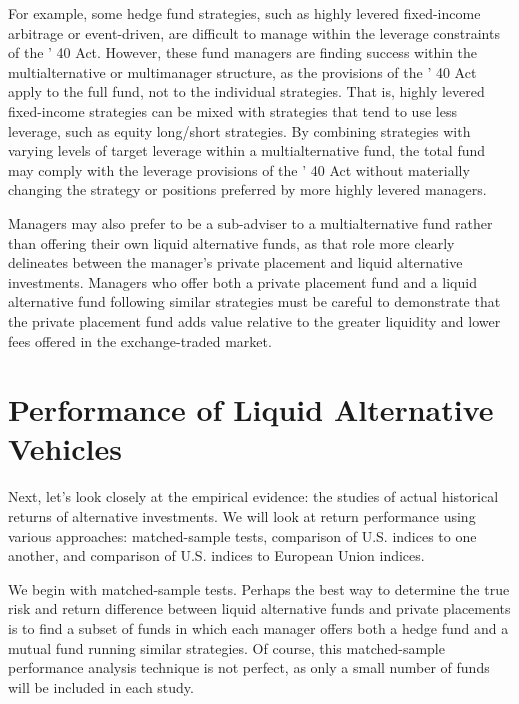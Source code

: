 \documentclass[11pt]{article}
\begin{document}
For example, some hedge fund strategies, such as highly levered fixed-income arbitrage or event-driven, are difficult to manage within the leverage constraints of the ' 40 Act. However, these fund managers are finding success within the multialternative or multimanager structure, as the provisions of the ' 40 Act apply to the full fund, not to the individual strategies. That is, highly levered fixed-income strategies can be mixed with strategies that tend to use less leverage, such as equity long/short strategies. By combining strategies with varying levels of target leverage within a multialternative fund, the total fund may comply with the leverage provisions of the ' 40 Act without materially changing the strategy or positions preferred by more highly levered managers.

Managers may also prefer to be a sub-adviser to a multialternative fund rather than offering their own liquid alternative funds, as that role more clearly delineates between the manager's private placement and liquid alternative investments. Managers who offer both a private placement fund and a liquid alternative fund following similar strategies must be careful to demonstrate that the private placement fund adds value relative to the greater liquidity and lower fees offered in the exchange-traded market.

\section*{Performance of Liquid Alternative Vehicles}
Next, let's look closely at the empirical evidence: the studies of actual historical returns of alternative investments. We will look at return performance using various approaches: matched-sample tests, comparison of U.S. indices to one another, and comparison of U.S. indices to European Union indices.

We begin with matched-sample tests. Perhaps the best way to determine the true risk and return difference between liquid alternative funds and private placements is to find a subset of funds in which each manager offers both a hedge fund and a mutual fund running similar strategies. Of course, this matched-sample performance analysis technique is not perfect, as only a small number of funds will be included in each study.
\end{document}
